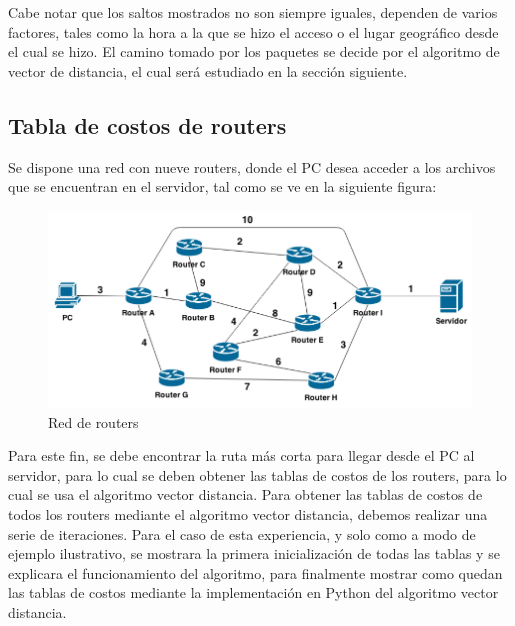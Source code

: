 \documentclass{article}
\begin{document}
Cabe notar que los saltos mostrados no son siempre iguales, dependen de varios factores, tales como la hora a la que se hizo el acceso o el lugar geográfico desde el cual se hizo. El camino tomado por los paquetes se decide por el algoritmo de vector de distancia, el cual será estudiado en la sección siguiente.
\clearpage

\subsection{Tabla de costos de routers}

Se dispone una red con nueve routers, donde el PC desea acceder a los archivos que se encuentran en el servidor, tal como se ve en la siguiente figura:

\begin{figure}[H]
\centering
\includegraphics[width=\textwidth]{grafoTarea.png}
\caption{Red de routers}
\label{fig:embajadaChilena}
\end{figure}  

Para este fin, se debe encontrar la ruta más corta para llegar desde el PC al servidor, para lo cual se deben obtener las tablas de costos de los routers, para lo cual se usa el algoritmo vector distancia. Para obtener las tablas de costos de todos los routers mediante el algoritmo vector distancia, debemos realizar una serie de iteraciones. Para el caso de esta experiencia, y solo como a modo de ejemplo ilustrativo, se mostrara la primera inicialización de todas las tablas y se explicara el funcionamiento del algoritmo, para finalmente mostrar como quedan las tablas de costos mediante la implementación en Python del algoritmo vector distancia.
\end{document}
